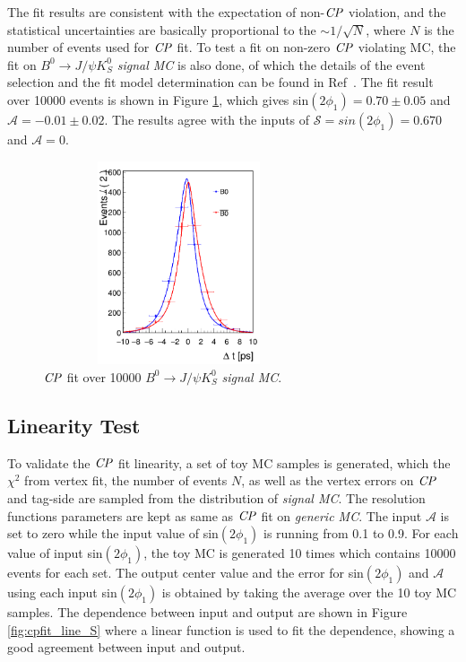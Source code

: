 The fit results are consistent with the expectation of non-$\it{CP}$ violation, and the statistical uncertainties are basically proportional to the $\sim 1/\sqrt{N}$, where $N$ is the number of events used for $\it{CP}$ fit. To test a fit on non-zero $\it{CP}$ violating MC, the fit on $B^0\to J/\psi K_S^0$ \textit{signal MC} is also done, of which the details of the event selection and the fit model determination can be found in Ref~\cite{jpsiks_ichep}. The fit result over 10000 events is shown in Figure \ref{fig:cpfit_jpsiks}, which gives sin$(2\phi_1) = 0.70 \pm 0.05 $ and $\mathcal{A} = -0.01\pm 0.02$. The results agree with the inputs of $\mathcal{S}=sin(2\phi_1)=0.670$ and $\mathcal{A}=0$.
\begin{figure}[htpb]
	\centering
	\includegraphics[width=8cm, height=6cm]{figures/jpsiks_cpfit10000}
	\caption{$\it{CP}$ fit over 10000 $B^0\to J/\psi K_S^0$ \textit{signal MC}. }
	\label{fig:cpfit_jpsiks}
\end{figure}

\subsection{Linearity Test}
To validate the $\it{CP}$ fit linearity, a set of toy MC samples is generated, which the $\chi^2$ from vertex fit, the number of events $N$, as well as the vertex errors on $\it{CP}$ and tag-side are sampled from the distribution of \textit{signal MC}. The resolution functions parameters are kept as same as $\it{CP}$ fit on \textit{generic MC}. The input $\mathcal{A}$ is set to zero while the input value of sin$(2\phi_1)$ is running from 0.1 to 0.9. For each value of input sin$(2\phi_1)$, the toy MC is generated 10 times which contains 10000 events for each set. The output center value and the error for sin$(2\phi_1)$ and  $\mathcal{A}$ using each input sin$(2\phi_1)$ is obtained by taking the average over the 10 toy MC samples.
The dependence between input and output are shown in Figure \ref{fig:cpfit_line_S} where a linear function is used to fit the dependence, showing a good agreement between input and output.

